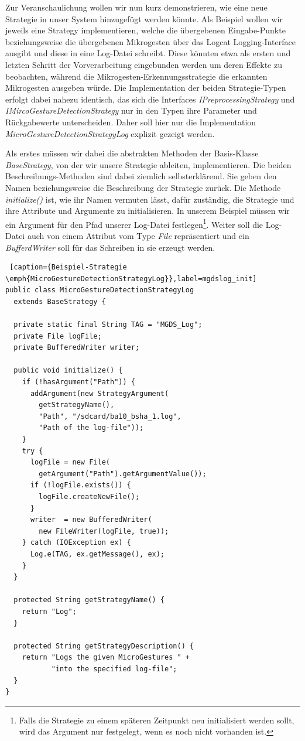 Zur Veranschaulichung wollen wir nun kurz demonstrieren, wie eine neue Strategie in unser System hinzugefügt werden könnte. Als Beispiel wollen wir jeweils eine Strategy implementieren, welche die übergebenen Eingabe-Punkte beziehungsweise die übergebenen Mikrogesten über das Logcat Logging-Interface ausgibt und diese in eine Log-Datei schreibt. Diese könnten etwa als ersten und letzten Schritt der Vorverarbeitung eingebunden werden um deren Effekte zu beobachten, während die Mikrogesten-Erkennungsstrategie die erkannten Mikrogesten ausgeben würde. Die Implementation der beiden Strategie-Typen erfolgt dabei nahezu identisch, das sich die Interfaces \emph{IPreprocessingStrategy} und \emph{IMircoGestureDetectionStrategy} nur in den Typen ihre Parameter und Rückgabewerte unterscheiden. Daher soll hier nur die Implementation \emph{MicroGestureDetectionStrategyLog} explizit gezeigt werden.

Als erstes müssen wir dabei die abstrakten Methoden der Basis-Klasse \emph{BaseStrategy}, von der wir unsere Strategie ableiten, implementieren. Die beiden Beschreibungs-Methoden sind dabei ziemlich selbsterklärend. Sie geben den Namen beziehungsweise die Beschreibung der Strategie zurück. Die Methode \emph{initialize()} ist, wie ihr Namen vermuten lässt, dafür zuständig, die Strategie und ihre Attribute und Argumente zu initialisieren. In unserem Beispiel müssen wir ein Argument für den Pfad unserer Log-Datei festlegen\footnote{Falls die Strategie zu einem späteren Zeitpunkt neu initialisiert werden sollt, wird das Argument nur festgelegt, wenn es noch nicht vorhanden ist.}. Weiter soll die Log-Datei auch von einem Attribut vom Type \emph{File} repräsentiert und ein \emph{BufferdWriter} soll für das Schreiben in sie erzeugt werden.

\begin{lstlisting} [caption={Beispiel-Strategie \emph{MicroGestureDetectionStrategyLog}},label=mgdslog_init]
public class MicroGestureDetectionStrategyLog 
  extends BaseStrategy {

  private static final String TAG = "MGDS_Log";
  private File logFile;
  private BufferedWriter writer;

  public void initialize() {
    if (!hasArgument("Path")) {
      addArgument(new StrategyArgument(
        getStrategyName(), 
        "Path", "/sdcard/ba10_bsha_1.log", 
        "Path of the log-file"));
    }
    try {
      logFile = new File(
        getArgument("Path").getArgumentValue());
      if (!logFile.exists()) {
        logFile.createNewFile();
      }
      writer  = new BufferedWriter(
        new FileWriter(logFile, true));
    } catch (IOException ex) {
      Log.e(TAG, ex.getMessage(), ex);
    }
  }

  protected String getStrategyName() {
    return "Log";
  }

  protected String getStrategyDescription() {
    return "Logs the given MicroGestures " + 
           "into the specified log-file";
  }
}
\end{lstlisting}

